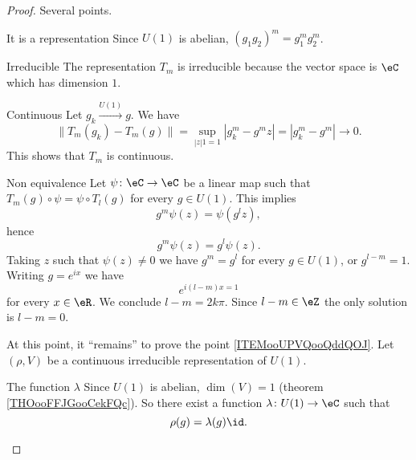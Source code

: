 \begin{proof}
    Several points.
    \begin{subproof}
        \item[It is a representation]
            Since \( U(1)\) is abelian, \( (g_1g_2)^m=g_1^mg_2^m\).
        \item[Irreducible]
            The representation \( T_m\) is irreducible because the vector space is \( \eC\) which has dimension \( 1\).
        \item[Continuous]
            Let \( g_k\stackrel{U(1)}{\longrightarrow}g\). We have
            \begin{equation}
                \| T_m(g_k)-T_m(g) \|=\sup_{| z |1=1}| g_k^m-g^mz |=| g_k^m-g^m |\to 0.
            \end{equation}
            This shows that \( T_m\) is continuous.
        \item[Non equivalence]
            Let \( \psi\colon \eC\to \eC\) be a linear map such that \( T_m(g)\circ\psi=\psi\circ T_l(g)\) for every \( g\in U(1)\). This implies
            \begin{equation}
                g^m\psi(z)=\psi(g^lz),
            \end{equation}
            hence
            \begin{equation}
                g^m\psi(z)=g^l\psi(z).
            \end{equation}
            Taking \( z\) such that \( \psi(z)\neq 0\) we have \( g^m=g^l\) for every \( g\in U(1)\), or \( g^{l-m}=1\). Writing \( g= e^{ix}\) we have
            \begin{equation}
                e^{i(l-m)x=1}
            \end{equation}
            for every \( x\in \eR\). We conclude \( l-m=2k \pi\). Since \( l-m\in \eZ\) the only solution is \( l-m=0\).
            
    \end{subproof}
    At this point, it ``remains'' to prove the point \ref{ITEMooUPVQooQddQOJ}. Let \( (\rho, V)\) be a continuous irreducible representation of \( U(1)\). 
    
    \begin{subproof}
        \item[The function \( \lambda\)]
            Since \( U(1)\) is abelian, \( \dim(V)=1\) (theorem \ref{THOooFFJGooCekFQc}). So there exist a function \( \lambda\colon U(1)\to \eC\) such that 
            \begin{equation}
                \rho(g)=\lambda(g)\id.
            \end{equation}


\end{subproof}
\end{proof}
